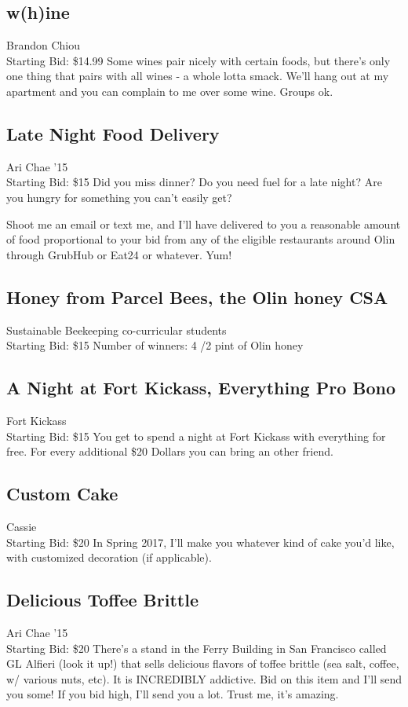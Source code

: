 \documentclass[11pt]{article}
\begin{document}
\subsection{w(h)ine}
Brandon Chiou
\\
Starting Bid: \$14.99
\newline
Some wines pair nicely with certain foods, but there's only one thing that pairs with all wines - a whole lotta smack. We'll hang out at my apartment and you can complain to me over some wine. Groups ok.
\subsection{Late Night Food Delivery}
Ari Chae '15
\\
Starting Bid: \$15
\newline
Did you miss dinner? Do you need fuel for a late night? Are you hungry for something you can't easily get?

Shoot me an email or text me, and I'll have delivered to you a reasonable amount of food proportional to your bid from any of the eligible restaurants around Olin through GrubHub or Eat24 or whatever. Yum!
\subsection{Honey from Parcel Bees, the Olin honey CSA}
Sustainable Beekeeping co-curricular students
\\
Starting Bid: \$15
\newline
Number of winners: 4
/2 pint of Olin honey
\subsection{A Night at Fort Kickass, Everything Pro Bono }
Fort Kickass
\\
Starting Bid: \$15
\newline
You get to spend a night at Fort Kickass with everything for free. For every additional \$20 Dollars you can bring an other friend.
\subsection{Custom Cake}
Cassie
\\
Starting Bid: \$20
\newline
In Spring 2017, I'll make you whatever kind of cake you'd like, with customized decoration (if applicable).
\subsection{Delicious Toffee Brittle}
Ari Chae '15
\\
Starting Bid: \$20
\newline
There's a stand in the Ferry Building in San Francisco called GL Alfieri (look it up!) that sells delicious flavors of toffee brittle (sea salt, coffee, w/ various nuts, etc). It is INCREDIBLY addictive. Bid on this item and I'll send you some! If you bid high, I'll send you a lot. Trust me, it's amazing.
\end{document}
